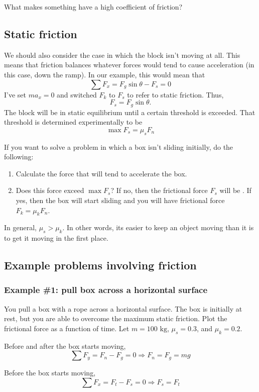 What makes something have a high coefficient of friction?

\subsection{Static friction}
We should also consider the case in which the block isn't moving at all. This means that friction balances whatever forces would tend to cause acceleration (in this case, down the ramp). In our example, this would mean that
$$\sum F_x=F_g\sin\theta-F_s=0$$
I've set $ma_x=0$ and switched $F_k$ to $F_s$ to refer to static friction. Thus,
$$F_s=F_g\sin\theta.$$
The block will be in static equilibrium until a certain threshold is exceeded. That threshold is determined experimentally to be
$$\boxed{\max F_s=\mu_s F_n}$$

If you want to solve a problem in which a box isn't sliding initially, do the following:
\begin{enumerate}
\item Calculate the force that will tend to accelerate the box.
\item Does this force exceed $\max F_s$? If no, then the frictional force $F_s$ will be . If yes, then the box will start sliding and you will have frictional force $F_k=\mu_k F_n$.
\end{enumerate}
In general, $\mu_s>\mu_k$. In other words, its easier to keep an object moving than it is to get it moving in the first place.

\subsection{Example problems involving friction}
\subsubsection*{Example \#1: pull box across a horizontal surface}
You pull a box with a rope across a horizontal surface. The box is initially at rest, but you are able to overcome the maximum static friction. Plot the frictional force as a function of time. Let $m=100\mbox{ kg}$, $\mu_s=0.3$, and $\mu_k=0.2$.

\vspace{5cm}

Before and after the box starts moving,
$$\sum F_y = F_n-F_g=0\Rightarrow F_n=F_g=mg$$

Before the box starts moving,
$$\sum F_x=F_t-F_s=0\Rightarrow F_s=F_t$$

